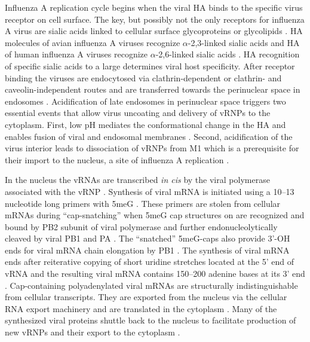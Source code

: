 	Influenza A replication cycle begins when the viral \gls{HA} binds to the specific virus receptor on cell surface. The key, but possibly not the only receptors for influenza A virus are sialic acids linked to cellular surface glycoproteins or glycolipids \parencite{Skehel2000, Stray2000, Martin1998}. \gls{HA} molecules of avian influenza A viruses recognize $\alpha$-2,3-linked sialic acids and \gls{HA} of human influenza A viruses recognize $\alpha$-2,6-linked sialic acids \parencite{Connor1994, VanRiel2010}. \gls{HA} recognition of specific sialic acids to a large determines viral host specificity. After receptor binding the viruses are endocytosed via clathrin-dependent or clathrin- and caveolin-independent routes and are transferred towards the perinuclear space in endosomes \parencite{Dourmashkin1974, Matlin1981, Sieczkarski2002, Lakadamyali2003}. Acidification of late endosomes in perinuclear space triggers two essential events that allow virus uncoating and delivery of \gls{vRNP}s to the cytoplasm. First, low pH mediates the conformational change in the \gls{HA} and enables fusion of viral and endosomal membranes \parencite{Carr1993}. Second, acidification of the virus interior leads to dissociation of \glspl{vRNP} from \gls{M1} which is a prerequisite for their import to the nucleus, a site of influenza A replication \parencite{Bui1996}. 
	
	In the nucleus the \glspl{vRNA} are transcribed \textit{in cis} by the viral polymerase associated with the \gls{vRNP} \parencite{Moeller2012}. Synthesis of viral mRNA is initiated using a 10--13 nucleotide long primers with \gls{5meG} \parencite{Beaton1981, Plotch1981a}. These primers are stolen from cellular mRNAs during ``cap-snatching'' when \gls{5meG} cap structures on are recognized and bound by \gls{PB2} subunit of viral polymerase \parencite{Guilligay2008} and further endonucleolytically cleaved by viral \gls{PB1} and \gls{PA} \parencite{Li2001, Dias2009, Yuan2009}. The ``snatched'' \gls{5meG}-caps also provide 3'-OH ends for viral mRNA chain elongation by \gls{PB1} \parencite{Poch1989}. The synthesis of viral mRNA ends after reiterative copying of short uridine stretches located at the 5' end of vRNA and the resulting viral mRNA contains 150--200 adenine bases at its 3' end \parencite{Plotch1977, Robertson1981d, Poon1999}. Cap-containing polyadenylated viral mRNAs are structurally indistinguishable from cellular transcripts. They are exported from the nucleus via the cellular RNA export machinery and are translated in the cytoplasm \parencite{Chen2000}. Many of the synthesized viral proteins  shuttle back to the nucleus to facilitate production of new \gls{vRNP}s and their export to the cytoplasm \parencite{Greenspan1988, Neumann1997, Huet2010, Wang2013}. 
	

